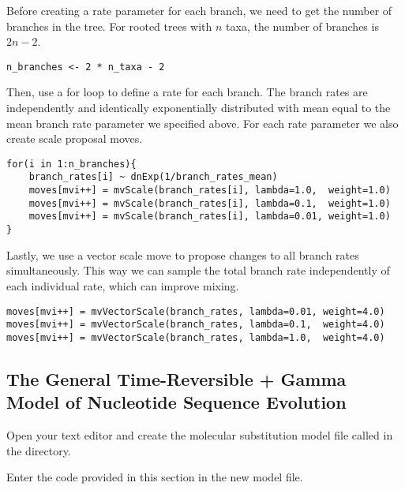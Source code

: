 Before creating a rate parameter for each branch, we need to get the number of branches in the tree. For rooted trees with $n$ taxa, the number of branches is $2n-2$.

{\tt \begin{snugshade*}
\begin{lstlisting}
n_branches <- 2 * n_taxa - 2
\end{lstlisting}
\end{snugshade*}}

Then, use a for loop to define a rate for each branch.
The branch rates are independently and identically exponentially distributed with mean equal to the mean branch rate parameter we specified above.
For each rate parameter we also create scale proposal moves.
{\tt \begin{snugshade*}
\begin{lstlisting}
for(i in 1:n_branches){
    branch_rates[i] ~ dnExp(1/branch_rates_mean)
    moves[mvi++] = mvScale(branch_rates[i], lambda=1.0,  weight=1.0)
    moves[mvi++] = mvScale(branch_rates[i], lambda=0.1,  weight=1.0)
    moves[mvi++] = mvScale(branch_rates[i], lambda=0.01, weight=1.0)
}
\end{lstlisting}
\end{snugshade*}}

Lastly, we use a vector scale move to propose changes to all branch rates simultaneously.
This way we can sample the total branch rate independently of each individual rate, which can improve mixing.
{\tt \begin{snugshade*}
\begin{lstlisting}
moves[mvi++] = mvVectorScale(branch_rates, lambda=0.01, weight=4.0) 
moves[mvi++] = mvVectorScale(branch_rates, lambda=0.1,  weight=4.0) 
moves[mvi++] = mvVectorScale(branch_rates, lambda=1.0,  weight=4.0)
\end{lstlisting}
\end{snugshade*}}

\bigskip

\subsection{The General Time-Reversible + Gamma Model of Nucleotide Sequence Evolution}\label{subsect:RB-ModelGTRG}

{\begin{framed}
Open your text editor and create the molecular substitution model file called {\textcolor{red}{}} in the  directory.

Enter the \Rev code provided in this section in the new model file.
\end{framed}}

